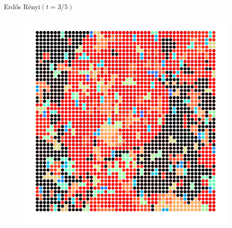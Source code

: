 \documentclass{beamer}
\newcommand{\ER}{Erd\H{o}s R\'enyi\xspace}
\begin{document}
\begin{frame}{\ER $(t=3/5)$}
        \begin{figure}[H]
                \centering
                \includegraphics[scale=0.7]{fig/postcrit.pdf}
        \end{figure}
\end{frame}
\end{document}
